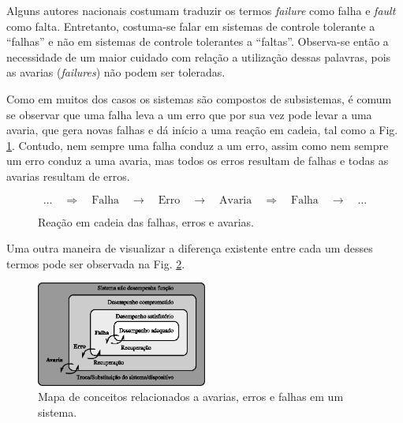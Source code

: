 Alguns autores nacionais costumam traduzir os termos {\it failure} como falha e
{\it fault} como falta. Entretanto, costuma-se falar em sistemas de controle
tolerante a ``falhas'' e não em sistemas de controle tolerantes a ``faltas''.
Observa-se então a necessidade de um maior cuidado com relação a utilização
dessas palavras, pois as avarias ({\it failures}) não podem ser toleradas.

Como em muitos dos casos os sistemas são compostos de subsistemas, é comum se
observar que uma falha leva a um erro que por sua vez pode levar a uma avaria,
que gera novas falhas e dá início a uma reação em cadeia, tal como a Fig.
\ref{fig:reacao_cadeia}. Contudo, nem sempre uma falha conduz a um erro, assim
como nem sempre um erro conduz a uma avaria, mas todos os erros resultam de
falhas e todas as avarias resultam de erros.

\begin{figure}[htb]
\centering
\[
\ldots
\quad\Longrightarrow\quad
\text{Falha} 
\quad\longrightarrow\quad
\text{Erro}
\quad\longrightarrow\quad
\text{Avaria}
\quad\Longrightarrow\quad
\text{Falha}
\quad\longrightarrow\quad
\ldots
\]
    \caption{Reação em cadeia das falhas, erros e avarias.}
    \label{fig:reacao_cadeia}
\end{figure}

Uma outra maneira de visualizar a diferença existente entre cada um desses
termos pode ser observada na Fig. \ref{fig:mapa_conceitos}.

\begin{figure}[htb]
\centering
    \includegraphics[width=0.5\textwidth]{imgs/aspectos/eps/mapa_conceitos}
    \caption{Mapa de conceitos relacionados a avarias, erros e falhas em um
             sistema.}
    \label{fig:mapa_conceitos}
\end{figure}


